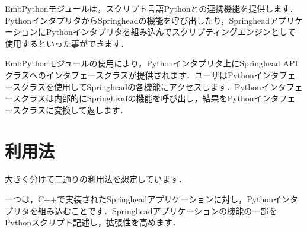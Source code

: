 %




%


%
% 
\begin{chapterabstract}
EmbPython\KLUDGE モジュールは，スクリプト言語Python\KLUDGE との連携機能を提供します．Python\KLUDGE インタプリタからSpringhead\KLUDGE の機能を呼び出したり，Springhead\KLUDGE アプリケーションにPython\KLUDGE インタプリタを組み込んでスクリプティングエンジンとして使用するといった事ができます．

EmbPython\KLUDGE モジュールの使用により，Python\KLUDGE インタプリタ上にSpringhead API\KLUDGE クラスへのインタフェースクラスが提供されます．ユーザはPython\KLUDGE インタフェースクラスを使用してSpringhead\KLUDGE の各機能にアクセスします．Python\KLUDGE インタフェースクラスは内部的にSpringhead\KLUDGE の機能を呼び出し，結果をPython\KLUDGE インタフェースクラスに変換して返します．
\end{chapterabstract}

%
% 
\section{\KLUDGE 利用法}

\KLUDGE 大きく分けて二通りの利用法を想定しています．

\KLUDGE 一つは，C++\KLUDGE で実装されたSpringhead\KLUDGE アプリケーションに対し，Python\KLUDGE インタプリタを組み込むことです．Springhead\KLUDGE アプリケーションの機能の一部をPython\KLUDGE スクリプト記述し，拡張性を高めます．


